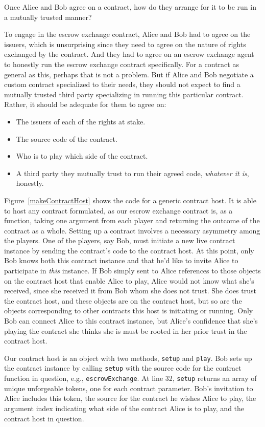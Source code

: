 \documentclass{llncs}
\begin{document}
Once Alice and Bob agree on a contract, how do they arrange for it to be run in a mutually trusted manner?

To engage in the escrow exchange contract, Alice and Bob had to agree on the issuers, which is unsurprising since they need to agree on the nature of rights exchanged by the contract. And they had to agree on an escrow exchange agent to honestly run the escrow exchange contract specifically. For a contract as general as this, perhaps that is not a problem. But if Alice and Bob negotiate a custom contract specialized to their needs, they should not expect to find a mutually trusted third party specializing in running this particular contract. Rather, it should be adequate for them to agree on:

\begin{itemize}
\renewcommand{\labelitemi}{$\bullet$}
\item The issuers of each of the rights at stake.
\item The source code of the contract.
\item Who is to play which side of the contract.
\item A third party they mutually trust to run their agreed code, \emph{whatever it is}, honestly.
\end{itemize}

Figure~\ref{makeContractHost} shows the code for a generic contract host. It is able to host any contract formulated, as our escrow exchange contract is, as a function, taking one argument from each player and returning the outcome of the contract as a whole. Setting up a contract involves a necessary asymmetry among the players. One of the players, say Bob, must initiate a new live contract instance by sending the contract's code to the contract host. At this point, only Bob knows both this contract instance and that he'd like to invite Alice to participate in \emph{this} instance. If Bob simply sent to Alice references to those objects on the contract host that enable Alice to play, Alice would not know what she's received, since she received it from Bob whom she does not trust. She does trust the contract host, and these objects are on the contract host, but so are the objects corresponding to other contracts this host is initiating or running. Only Bob can connect Alice to this contract instance, but Alice's confidence that she's playing the contract she thinks she is must be rooted in her prior trust in the contract host.

Our contract host is an object with two methods, {\tt setup} and {\tt play}. Bob sets up the contract instance by calling {\tt setup} with the source code for the contract function in question, e.g., {\tt escrowExchange}. At line 32, {\tt setup} returns an array of unique unforgeable tokens, one for each contract parameter. Bob's invitation to Alice includes this token, the source for the contract he wishes Alice to play, the argument index indicating what side of the contract Alice is to play, and the contract host in question.
\end{document}
